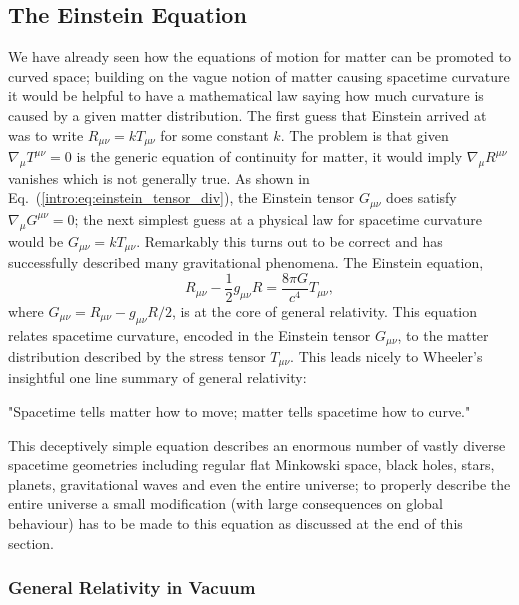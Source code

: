 \subsection{The Einstein Equation}
We have already seen how the equations of motion for matter can be promoted to curved space; building on the vague notion of matter causing spacetime curvature it would be helpful to have a mathematical law saying how much curvature is caused by a given matter distribution. The first guess that Einstein arrived at was to write $R_{\mu\nu}=kT_{\mu\nu}$ for some constant $k$. The problem is that given $\nabla_\mu T^{\mu\nu}=0$ is the generic equation of continuity for matter, it would imply $\nabla_\mu R^{\mu\nu}$ vanishes which is not generally true. As shown in Eq.~(\ref{intro:eq:einstein_tensor_div}), the Einstein tensor $G_{\mu\nu}$ does satisfy $\nabla_\mu G^{\mu\nu}=0$; the next simplest guess at a physical law for spacetime curvature would be $G_{\mu\nu} = k T_{\mu\nu}$. Remarkably this turns out to be correct and has successfully described many gravitational phenomena. The Einstein equation,
\begin{equation}\label{intro:eq:einstein}
R_{\mu\nu} - \frac{1}{2}g_{\mu\nu}R = \frac{8 \pi G}{c^4}T_{\mu\nu},
\end{equation}
where $G_{\mu\nu} = R_{\mu\nu}- g_{\mu\nu}R/2$, is at the core of general relativity. This equation relates spacetime curvature, encoded in the Einstein tensor $G_{\mu\nu}$, to the matter distribution described by the stress tensor $T_{\mu\nu}$. This leads nicely to Wheeler's insightful one line summary of general relativity:

{\it \begin{center}{"Spacetime tells matter how to move; matter tells spacetime how to curve."}\end{center} }

This deceptively simple equation \color{orchid} describes an enormous number \color{black} of vastly diverse spacetime geometries including regular flat Minkowski space, black holes, stars, planets, gravitational waves and even the entire universe; to properly describe the entire universe a small modification \color{orchid} (with large consequences on global behaviour) \color{black} has to be made to this equation as discussed at the end of this section.



\subsubsection*{General Relativity in Vacuum}

